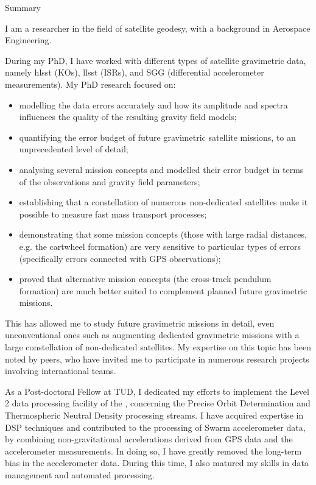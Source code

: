 
\begin{cvtext}{Summary}

I am a researcher in the field of satellite geodesy, with a background in Aerospace Engineering.

During my PhD, I have worked with different types of satellite gravimetric data, namely \acl{hlsst} (\aclp{KO}), \acl{llsst} (\aclp{ISR}), and \acl{SGG} (differential accelerometer measurements).
My PhD research focused on:
\begin{itemize}[topsep=0pt,itemsep=1pt,parsep=0pt,partopsep=0pt]
\item modelling the data errors accurately and how its amplitude and spectra influences the quality of the resulting gravity field models;
\item quantifying the error budget of future gravimetric satellite missions, to an unprecedented level of detail;
\item analysing several mission concepts and modelled their error budget in terms of the observations and gravity field parameters;
\item establishing that a constellation of numerous non-dedicated satellites make it possible to measure fast mass transport processes;
\item demonstrating that some mission concepts (those with large radial distances, \acs{e.g.} the cartwheel formation) are very sensitive to particular types of errors (specifically errors connected with \ac{GPS} observations); %
\item proved that alternative mission concepts (the cross-track pendulum formation) are much better suited to complement planned future gravimetric missions.%
\end{itemize}
This has allowed me to study future gravimetric missions in detail, even unconventional ones such as augmenting dedicated gravimetric missions with a large constellation of non-dedicated satellites.
My expertise on this topic has been noted by peers, who have invited me to participate in numerous research projects involving international teams.

As a Post-doctoral Fellow at \ac{TUD}, I dedicated my efforts to implement the Level 2 data processing facility of the , concerning the Precise Orbit Determination and Thermospheric Neutral Density processing streams.
I have acquired expertise in \ac{DSP} techniques and contributed to the processing of Swarm accelerometer data, by combining non-gravitational accelerations derived from \ac{GPS} data and the accelerometer measurements.
In doing so, I have greatly removed the long-term bias in the accelerometer data.
During this time, I also matured my skills in data management and automated processing.


\end{cvtext}
